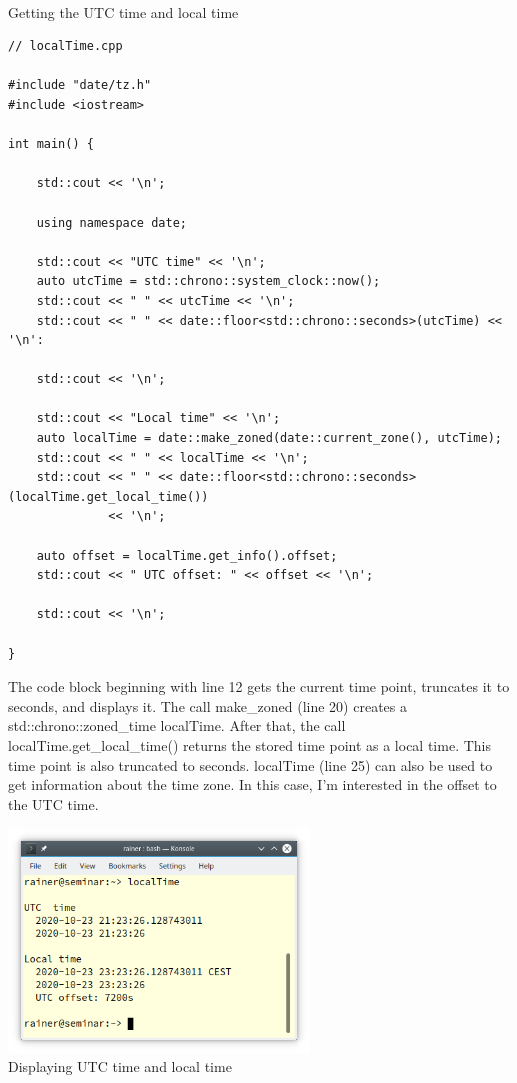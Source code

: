 \hspace*{\fill} \\ %
\noindent
Getting the UTC time and local time
\begin{lstlisting}[style=styleCXX]
// localTime.cpp

#include "date/tz.h"
#include <iostream>

int main() {

	std::cout << '\n';
	
	using namespace date;
	
	std::cout << "UTC time" << '\n';
	auto utcTime = std::chrono::system_clock::now();
	std::cout << " " << utcTime << '\n';
	std::cout << " " << date::floor<std::chrono::seconds>(utcTime) << '\n':
	
	std::cout << '\n';
	
	std::cout << "Local time" << '\n';
	auto localTime = date::make_zoned(date::current_zone(), utcTime);
	std::cout << " " << localTime << '\n';
	std::cout << " " << date::floor<std::chrono::seconds>(localTime.get_local_time())
	          << '\n';
	
	auto offset = localTime.get_info().offset;
	std::cout << " UTC offset: " << offset << '\n';

	std::cout << '\n';

}
\end{lstlisting}

The code block beginning with line 12 gets the current time point, truncates it to seconds, and displays it. The call make\_zoned (line 20) creates a std::chrono::zoned\_time localTime. After that, the call localTime.get\_local\_time() returns the stored time point as a local time. This time point is also truncated to seconds. localTime (line 25) can also be used to get information about the time zone. In this case, I’m interested in the offset to the UTC time.

\begin{center}
\includegraphics[width=0.6\textwidth]{content/3/chapter5/images/27.png}\\
Displaying UTC time and local time
\end{center}

